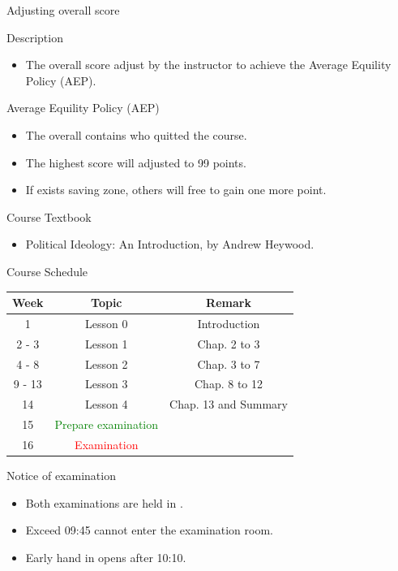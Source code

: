 \documentclass{beamer}
\begin{document}
\begin{frame}{Adjusting overall score}
\begin{block}{Description}
\begin{itemize}
\item The overall score adjust by the instructor to achieve the Average Equility Policy (AEP).
\end{itemize}
\end{block}
\begin{block}{Average Equility Policy (AEP)}
\begin{itemize}
\item The overall contains who quitted the course.
\item The highest score will adjusted to 99 points.
\item If exists saving zone, others will free to gain one more point.
\end{itemize}
\end{block}
\end{frame}
\begin{frame}{Course Textbook}
\begin{itemize}
\item Political Ideology: An Introduction, by Andrew Heywood.
\end{itemize}
\end{frame}
\begin{frame}{Course Schedule}
\begin{center}
\begin{tabular}{|c|c|c|}
\hline
Week & Topic & Remark \\
\hline
1 & Lesson 0 & Introduction\\
\hline
2 - 3 & Lesson 1 & Chap. 2 to 3 \\
\hline
4 - 8 & Lesson 2 & Chap. 3 to 7 \\
\hline
9 - 13 & Lesson 3 & Chap. 8 to 12 \\
\hline
14 & Lesson 4 & Chap. 13 and Summary \\
\hline
15 & \textcolor{Green}{Prepare examination} & \\
\hline
16 & \textcolor{red}{Examination} &  \\
\hline
\end{tabular}
\end{center}
\end{frame}
\begin{frame}{Notice of examination}
\begin{itemize}
\item Both examinations are held in .
\item Exceed 09:45 cannot enter the examination room.
\item Early hand in opens after 10:10.
\end{itemize}
\end{frame}
\end{document}

